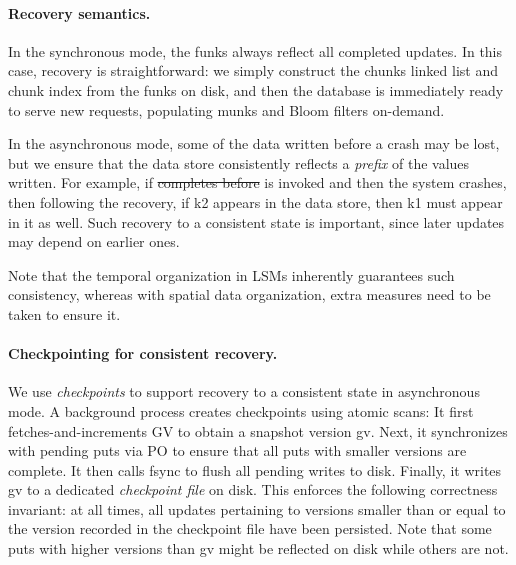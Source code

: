 \documentclass[sigplan,10pt]{acmart}
\newcommand{\code}[1]{\textsf{\fontsize{9}{11}\selectfont #1}}
\providecommand{\DIFadd}[1]{{\protect\color{blue}\uwave{#1}}} %
\providecommand{\DIFdel}[1]{{\protect\color{red}\sout{#1}}}                      %
\providecommand{\DIFaddbegin}{} %
\providecommand{\DIFaddend}{} %
\providecommand{\DIFdelbegin}{} %
\providecommand{\DIFdelend}{} %
\begin{document}
\paragraph{Recovery semantics.}
In the synchronous mode, 
the funks always reflect all completed updates. In this case, recovery is straightforward: we simply construct
the chunks linked list and chunk index from the funks on disk, and then the database is immediately ready to serve new requests, populating munks and Bloom filters on-demand.  

In the asynchronous mode, some of the  data written before a crash may be lost, but we  
ensure that the data store consistently reflects a \emph{prefix} of the  values written.
For example, if \DIFdelbegin %
\DIFdel{completes before }%
\DIFdelend \DIFaddbegin \DIFadd{put(k1, v1) completes before put(k2, v2) 
}\DIFaddend is invoked and then the system crashes, then following the recovery, 
if \code{k2} appears in the data store, then \code{k1} must appear in it as well. 
Such recovery to a consistent state is important, since later updates may depend on earlier ones. 

Note that the temporal organization in LSMs inherently guarantees such consistency, whereas with spatial data organization,
extra measures need to be taken to ensure it.

\paragraph{Checkpointing for consistent recovery.}

We use \emph{checkpoints} to support recovery to a consistent state in asynchronous mode.
A background process creates checkpoints using atomic scans: 
It first fetches-and-increments GV to obtain a snapshot version \code{gv}.  Next, 
it synchronizes with pending puts via PO to ensure that all puts with smaller versions are complete. 
It then calls \code{fsync} to flush all pending writes to disk.
Finally, it writes \code{gv} to a dedicated \emph{checkpoint file} on disk.
This enforces the following correctness invariant: at all times, all updates pertaining to versions smaller 
than or equal to the version recorded in the checkpoint file have been persisted.
Note that some puts with higher versions than \code{gv} might be reflected on disk while others are not. 
\end{document}
